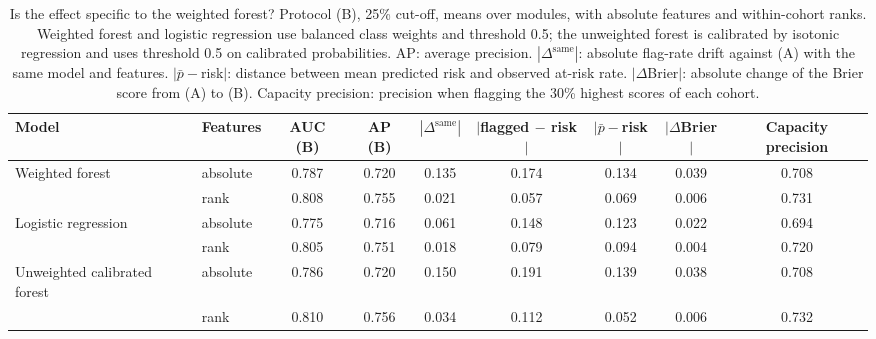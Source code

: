 \begin{table}[t]
\centering
\caption{Is the effect specific to the weighted forest? Protocol (B), 25\% cut-off, means over modules, with absolute features and within-cohort ranks. Weighted forest and logistic regression use balanced class weights and threshold 0.5; the unweighted forest is calibrated by isotonic regression and uses threshold 0.5 on calibrated probabilities. AP: average precision. $|\Delta^{\mathrm{same}}|$: absolute flag-rate drift against (A) with the same model and features. $|\bar{p}-$risk$|$: distance between mean predicted risk and observed at-risk rate. $|\Delta$Brier$|$: absolute change of the Brier score from (A) to (B). Capacity precision: precision when flagging the 30\% highest scores of each cohort.}
\label{tab:models}
\footnotesize
\begin{tabular}{@{}llccccccc@{}}
\toprule
Model & Features & AUC (B) & AP (B) & $|\Delta^{\mathrm{same}}|$ & $|$flagged $-$ risk$|$ & $|\bar{p}-$risk$|$ & $|\Delta$Brier$|$ & Capacity precision \\
\midrule
Weighted forest & absolute & 0.787 & 0.720 & 0.135 & 0.174 & 0.134 & 0.039 & 0.708 \\
 & rank & 0.808 & 0.755 & 0.021 & 0.057 & 0.069 & 0.006 & 0.731 \\
\midrule
Logistic regression & absolute & 0.775 & 0.716 & 0.061 & 0.148 & 0.123 & 0.022 & 0.694 \\
 & rank & 0.805 & 0.751 & 0.018 & 0.079 & 0.094 & 0.004 & 0.720 \\
\midrule
Unweighted calibrated forest & absolute & 0.786 & 0.720 & 0.150 & 0.191 & 0.139 & 0.038 & 0.708 \\
 & rank & 0.810 & 0.756 & 0.034 & 0.112 & 0.052 & 0.006 & 0.732 \\
\bottomrule
\end{tabular}
\end{table}
